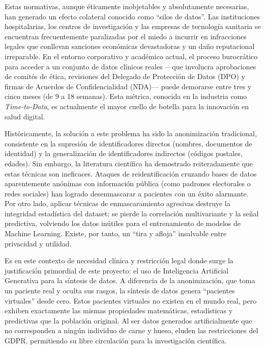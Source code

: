 Estas normativas, aunque éticamente inobjetables y absolutamente necesarias, han generado un efecto colateral conocido como ``silos de datos''. Las instituciones hospitalarias, los centros de investigación y las empresas de tecnología sanitaria se encuentran frecuentemente paralizadas por el miedo a incurrir en infracciones legales que conllevan sanciones económicas devastadoras y un daño reputacional irreparable. En el entorno corporativo y académico actual, el proceso burocrático para acceder a un conjunto de datos clínicos reales —que involucra aprobaciones de comités de ética, revisiones del Delegado de Protección de Datos (DPO) y firmas de Acuerdos de Confidencialidad (NDA)— puede demorarse entre tres y cinco meses (de 9 a 18 semanas). Esta métrica, conocida en la industria como \textit{Time-to-Data}, es actualmente el mayor cuello de botella para la innovación en salud digital.

Históricamente, la solución a este problema ha sido la anonimización tradicional, consistente en la supresión de identificadores directos (nombres, documentos de identidad) y la generalización de identificadores indirectos (códigos postales, edades). Sin embargo, la literatura científica ha demostrado reiteradamente que estas técnicas son ineficaces. Ataques de reidentificación cruzando bases de datos aparentemente anónimas con información pública (como padrones electorales o redes sociales) han logrado desenmascarar a pacientes con un éxito alarmante. Por otro lado, aplicar técnicas de enmascaramiento agresivas destruye la integridad estadística del dataset; se pierde la correlación multivariante y la señal predictiva, volviendo los datos inútiles para el entrenamiento de modelos de Machine Learning. Existe, por tanto, un ``tira y afloja'' insalvable entre privacidad y utilidad.

Es en este contexto de necesidad clínica y restricción legal donde surge la justificación primordial de este proyecto: el uso de Inteligencia Artificial Generativa para la síntesis de datos. A diferencia de la anonimización, que toma un paciente real y oculta sus rasgos, la síntesis de datos genera ``pacientes virtuales'' desde cero. Estos pacientes virtuales no existen en el mundo real, pero exhiben exactamente las mismas propiedades matemáticas, estadísticas y predictivas que la población original. Al ser datos generados artificialmente que no corresponden a ningún individuo de carne y hueso, eluden las restricciones del GDPR, permitiendo su libre circulación para la investigación científica.

